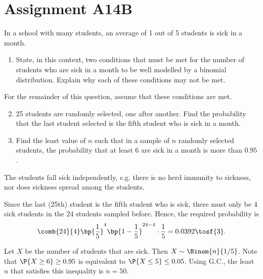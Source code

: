\section{Assignment A14B}

\begin{problem}
    In a school with many students, an average of 1 out of 5 students is sick in a month.

    \begin{enumerate}
        \item State, in this context, two conditions that must be met for the number of students who are sick in a month to be well modelled by a binomial distribution. Explain why each of these conditions may not be met.
    \end{enumerate}

    For the remainder of this question, assume that these conditions are met.

    \begin{enumerate}
        \setcounter{enumi}{1}
        \item 25 students are randomly selected, one after another. Find the probability that the last student selected is the fifth student who is sick in a month.
        \item Find the least value of $n$ such that in a sample of $n$ randomly selected students, the probability that at least 6 are sick in a month is more than $0.95$.
    \end{enumerate}
\end{problem}
\begin{solution}
    \begin{ppart}
        The students fall sick independently, e.g. there is no herd immunity to sickness, nor does sickness spread among the students.
    \end{ppart}
    \begin{ppart}
        Since the last (25th) student is the fifth student who is sick, there must only be 4 sick students in the 24 students sampled before. Hence, the required probability is \[\comb{24}{4} \bp{\frac15}^4 \bp{1 - \frac15}^{24-4} \cdot \frac15 = 0.0392 \tosf{3}.\]
    \end{ppart}
    \begin{ppart}
        Let $X$ be the number of students that are sick. Then $X \sim \Binom{n}{1/5}$. Note that $\P{X \geq 6} \geq 0.95$ is equivalent to $\P{X \leq 5} \leq 0.05$. Using G.C., the least $n$ that satisfies this inequality is $n = 50$.
    \end{ppart}
\end{solution}

